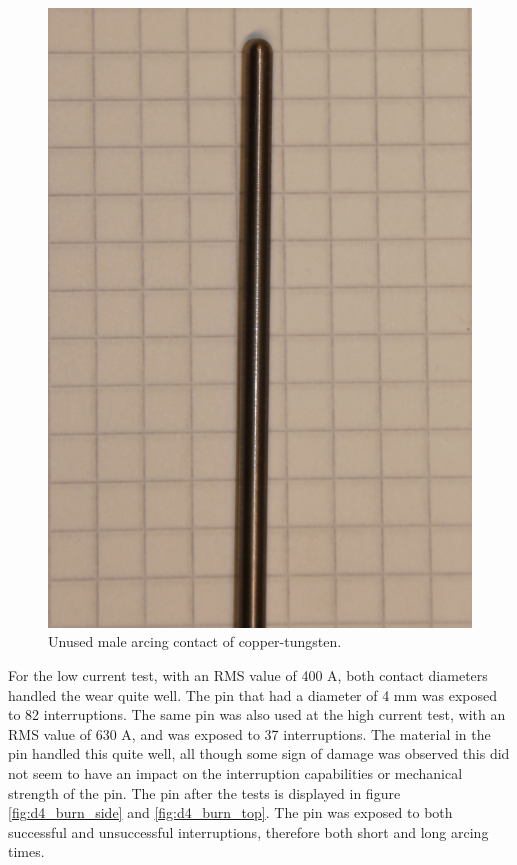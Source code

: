 \documentclass[10pt,a4paper]{article} %
\begin{document}
\begin{figure}[H]
\centering
\includegraphics[scale=0.3]{Bilder/Discussion/d3_unused.png}
\caption{Unused male arcing contact of copper-tungsten.} \label{fig:unused_d3}
\end{figure}

For the low current test, with an RMS value of 400 A, both contact diameters handled the wear quite well. The pin that had a diameter of 4 mm was exposed to 82 interruptions. The same pin was also used at the high current test, with an RMS value of 630 A, and was exposed to 37 interruptions. The material in the pin handled this quite well, all though some sign of damage was observed this did not seem to have an impact on the interruption capabilities or mechanical strength of the pin. The pin after the tests is displayed in figure \ref{fig:d4_burn_side} and \ref{fig:d4_burn_top}. The pin was exposed to both successful and unsuccessful interruptions, therefore both short and long arcing times.
\end{document}
